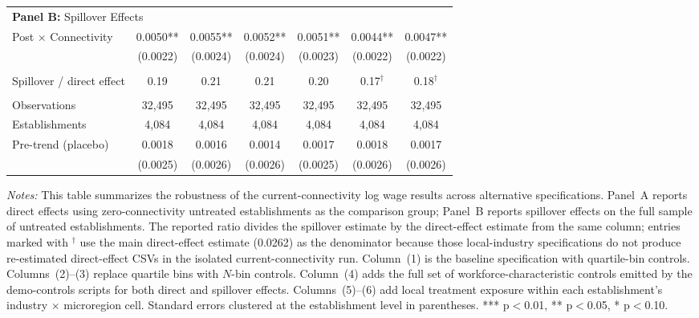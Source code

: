 \documentclass[11pt]{article}
\begin{document}
\begin{table}[H]
\begin{tabular}{lcccccc}
\multicolumn{7}{l}{\textbf{Panel B:} Spillover Effects} \\
Post $\times$ Connectivity & 0.0050** & 0.0055** & 0.0052** & 0.0051** & 0.0044** & 0.0047**\\
 & (0.0022) & (0.0024) & (0.0024) & (0.0023) & (0.0022) & (0.0022)\\
 &  &  &  &  &  & \\
Spillover / direct effect & 0.19 & 0.21 & 0.21 & 0.20 & 0.17$^\dagger$ & 0.18$^\dagger$\\
 &  &  &  &  &  & \\
Observations & 32{,}495 & 32{,}495 & 32{,}495 & 32{,}495 & 32{,}495 & 32{,}495\\
Establishments & 4{,}084 & 4{,}084 & 4{,}084 & 4{,}084 & 4{,}084 & 4{,}084\\
\midrule
Pre-trend (placebo) & 0.0018 & 0.0016 & 0.0014 & 0.0017 & 0.0018 & 0.0017\\
 & (0.0025) & (0.0026) & (0.0026) & (0.0025) & (0.0026) & (0.0026)\\
\bottomrule\bottomrule
\end{tabular}
\begin{minipage}{\linewidth}
    \scriptsize\vspace{4pt}
    \textit{Notes:} This table summarizes the robustness of the current-connectivity log wage results across alternative specifications. Panel~A reports direct effects using zero-connectivity untreated establishments as the comparison group; Panel~B reports spillover effects on the full sample of untreated establishments. The reported ratio divides the spillover estimate by the direct-effect estimate from the same column; entries marked with $^\dagger$ use the main direct-effect estimate (0.0262) as the denominator because those local-industry specifications do not produce re-estimated direct-effect CSVs in the isolated current-connectivity run. Column~(1) is the baseline specification with quartile-bin controls. Columns~(2)--(3) replace quartile bins with $N$-bin controls. Column~(4) adds the full set of workforce-characteristic controls emitted by the demo-controls scripts for both direct and spillover effects. Columns~(5)--(6) add local treatment exposure within each establishment's industry $\times$ microregion cell. Standard errors clustered at the establishment level in parentheses. *** p$<$0.01, ** p$<$0.05, * p$<$0.10.
\end{minipage}
\end{table}
\end{document}
